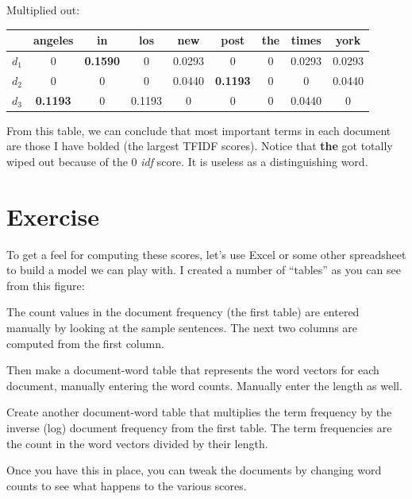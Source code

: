\documentclass[10pt]{article}
\begin{document}
\noindent Multiplied out:
 
 \begin{table}[H]
\begin{center}
\begin{tabular}{c|c|c|c|c|c|c|c|c}
 & angeles & in & los & new & post & the & times & york\\
\hline
$d_1$ & 0 & {\bf 0.1590} & 0 & 0.0293 & 0 & 0 & 0.0293 & 0.0293 \\
$d_2$ & 0 & 0 & 0 & 0.0440 & {\bf 0.1193} & 0 & 0 & 0.0440\\
$d_3$ & {\bf 0.1193} & 0 & 0.1193 & 0 & 0 & 0 & 0.0440 & 0\\
\end{tabular}
\end{center}
\label{default}
\end{table}%

From this table, we can conclude that most important terms in each document are those I have bolded (the largest TFIDF scores). Notice that {\bf the} got totally wiped out because of the 0 {\em idf} score. It is useless as a distinguishing word.

\section{Exercise}


To get a feel for computing these scores, let's use Excel or some other spreadsheet to build a model we can play with. I created a number of ``tables'' as you can see from this figure:

\begin{figure}[H]
\begin{center}
\label{default}
\end{center}
\end{figure}

The count values in the document frequency (the first table) are entered manually by looking at the sample sentences. The next two columns are computed from the first column.

Then make a document-word table that represents the word vectors for each document, manually entering the word counts. Manually enter the length as well.

Create another document-word table that multiplies the term frequency by the inverse (log) document frequency from the first table. The term frequencies are the count in the word vectors divided by their length.

Once you have this in place, you can tweak the documents by changing word counts to see what happens to the various scores.
\end{document}
